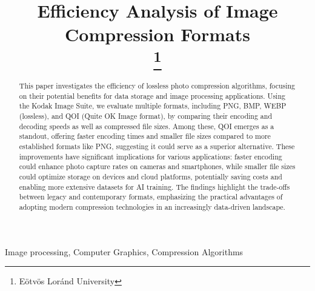 \documentclass[conference]{IEEEtran}
\begin{document}
\title{Efficiency Analysis of Image Compression Formats\\
\thanks{Eötvös Loránd University}
}

\author{
\and
{}
}

\maketitle

\begin{abstract}
This paper investigates the efficiency of lossless photo compression algorithms, focusing on their potential benefits for data storage and image processing applications. Using the Kodak Image Suite, we evaluate multiple formats, including PNG, BMP, WEBP (lossless), and QOI (Quite OK Image format), by comparing their encoding and decoding speeds as well as compressed file sizes. Among these, QOI emerges as a standout, offering faster encoding times and smaller file sizes compared to more established formats like PNG, suggesting it could serve as a superior alternative. These improvements have significant implications for various applications: faster encoding could enhance photo capture rates on cameras and smartphones, while smaller file sizes could optimize storage on devices and cloud platforms, potentially saving costs and enabling more extensive datasets for AI training. The findings highlight the trade-offs between legacy and contemporary formats, emphasizing the practical advantages of adopting modern compression technologies in an increasingly data-driven landscape.
\end{abstract}



\begin{IEEEkeywords}
Image processing, Computer Graphics, Compression Algorithms
\end{IEEEkeywords}
\end{document}
